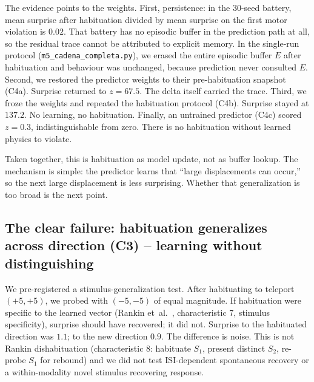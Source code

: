 \documentclass[11pt,a4paper]{article}
\begin{document}
The evidence points to the weights. First, persistence: in the 30-seed battery, mean surprise after habituation divided by mean surprise on the first motor violation is $0.02$. That battery has no episodic buffer in the prediction path at all, so the residual trace cannot be attributed to explicit memory. In the single-run protocol (\texttt{m5\_cadena\_completa.py}), we erased the entire episodic buffer $E$ after habituation and behaviour was unchanged, because prediction never consulted $E$. Second, we restored the predictor weights to their pre-habituation snapshot (C4a). Surprise returned to $z=67.5$. The delta itself carried the trace. Third, we froze the weights and repeated the habituation protocol (C4b). Surprise stayed at $137.2$. No learning, no habituation. Finally, an untrained predictor (C4c) scored $z=0.3$, indistinguishable from zero. There is no habituation without learned physics to violate.

Taken together, this is habituation as model update, not as buffer lookup. The mechanism is simple: the predictor learns that ``large displacements can occur,'' so the next large displacement is less surprising. Whether that generalization is too broad is the next point.

\subsection{The clear failure: habituation generalizes across direction (C3) -- learning without distinguishing}

We pre-registered a stimulus-generalization test. After habituating to teleport $(+5,+5)$, we probed with $(-5,-5)$ of equal magnitude. If habituation were specific to the learned vector (Rankin et~al.~\cite{rankin2009}, characteristic 7, stimulus specificity), surprise should have recovered; it did not. Surprise to the habituated direction was $1.1$; to the new direction $0.9$. The difference is noise. This is not Rankin dishabituation (characteristic 8: habituate $S_1$, present distinct $S_2$, re-probe $S_1$ for rebound) and we did not test ISI-dependent spontaneous recovery or a within-modality novel stimulus recovering response.
\end{document}
